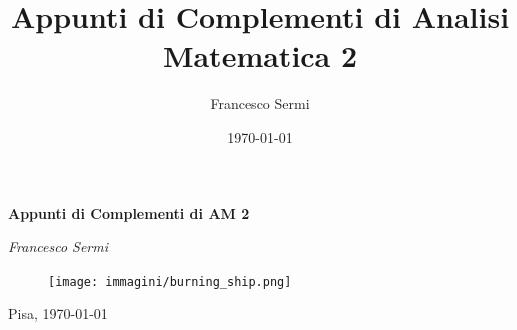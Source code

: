 \documentclass[oneside, italian, fontsize=10pt]{book}
\title{Appunti di Complementi di Analisi Matematica 2}
\author{Francesco Sermi}
\date{\today}
\begin{document}
	\begin{titlepage}
	\centering
	\vspace*{3cm}
	{\huge\bfseries Appunti di Complementi di AM 2 \par}
	\vspace{2cm}
	{\Large\itshape Francesco Sermi\par}
	\vfill
	\begin{figure}[H]
		\centering
		\texttt{[image: immagini/burning\_ship.png]}
	\end{figure}




	\vfill	
	{\large \hfill Pisa, \today \par}
	\end{titlepage}
\end{document}
